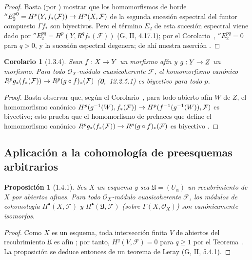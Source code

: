 \documentclass[10pt,oneside,openany]{book}
\theoremstyle{egaenv}\newtheorem*{env}{---}
\theoremstyle{egastatement}
\newtheorem*{proposition}{Proposición}
\newtheorem*{corollary}{Corolario}
\theoremstyle{egadescription}
\newcommand{\oldpage}[2][]{\marginnote{\normalfont\scriptsize\textbf{#1}\,|\,#2}\ignorespaces}
\renewcommand{\geq}{\geqslant}
\renewcommand{\to}{\mathchoice{\longrightarrow}{\rightarrow}{\rightarrow}{\rightarrow}}
\begin{document}
\begin{proof}
Basta (por ) mostrar que los homomorfismos de borde $''E_2^{p0}=H^p(Y,f_*(\mathcal F))\to H^p(X,\mathcal F)$ de la segunda sucesión espectral del funtor compuesto $\Gamma f_*$ son biyectivos.
Pero el término $E_2$ de esta sucesión espectral viene dado por $''E_2^{pq}=H^p(Y,R^qf_*(\mathcal F))$ (G, II, 4.17.1); por el Corolario~, $''E_2^{pq}=0$ para $q>0$, y la sucesión espectral degenera; de ahí nuestra aserción .
\end{proof}

\begin{corollary}[1.3.4]
\label{III.1.3.4}
\label{III.1.3.4-fr}
Sean $f:X\to Y$ un morfismo afín y $g:Y\to Z$ un morfismo.
\oldpage[III]{89}
Para todo $\mathcal O_X$-módulo cuasicoherente $\mathcal F$, el homomorfismo canónico $R^pg_*(f_*(\mathcal F))\to R^p(g\circ f)_*(\mathcal F)$ \textup{(\textbf{0},~12.2.5.1)} es biyectivo para todo $p$.
\end{corollary}

\begin{proof}
Basta observar que, según el Corolario~, para todo abierto afín $W$ de $Z$, el homomorfismo canónico $H^p(g^{-1}(W),f_*(\mathcal F))\to
H^p(f^{-1}(g^{-1}(W)),\mathcal F)$ es biyectivo; esto prueba que el homomorfismo de prehaces que define el homomorfismo canónico $R^pg_*(f_*(\mathcal F))\to R^p(g\circ f)_*(\mathcal F)$ es biyectivo .
\end{proof}

\subsection{Aplicación a la cohomología de preesquemas arbitrarios}
\label{subsection:III.1.4}
\label{subsection:III.1.4-fr}

\begin{proposition}[1.4.1]
\label{III.1.4.1}
\label{III.1.4.1-fr}
Sea $X$ un esquema y sea $\mathfrak U=(U_\alpha)$ un recubrimiento de $X$ por abiertos afines.
Para todo $\mathcal O_X$-módulo cuasicoherente $\mathcal F$, los módulos de cohomología $H^\bullet(X,\mathcal F)$ y $H^\bullet(\mathfrak U,\mathcal F)$ (sobre $\Gamma(X,\mathcal O_X)$) son canónicamente isomorfos.
\end{proposition}

\begin{proof}
Como $X$ es un esquema, toda intersección finita $V$ de abiertos del recubrimiento $\mathfrak U$ es afín ; por tanto, $H^q(V,\mathcal F)=0$ para $q\geq1$ por el Teorema~.
La proposición se deduce entonces de un teorema de Leray (G, II, 5.4.1).
\end{proof}
\end{document}
